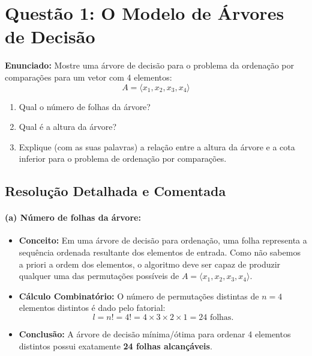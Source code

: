 \documentclass[11pt,a4paper]{article}
\begin{document}
\section*{Questão 1: O Modelo de Árvores de Decisão}

\textbf{Enunciado:} Mostre uma árvore de decisão para o problema da ordenação por comparações para um vetor com 4 elementos:
\[
A = \langle x_1, x_2, x_3, x_4 \rangle
\]
\begin{enumerate}
    \item[(a)] Qual o número de folhas da árvore?
    \item[(b)] Qual é a altura da árvore?
    \item[(c)] Explique (com as suas palavras) a relação entre a altura da árvore e a cota inferior para o problema de ordenação por comparações.
\end{enumerate}

\subsection*{Resolução Detalhada e Comentada}

\paragraph{(a) Número de folhas da árvore:}
\begin{itemize}
    \item \textbf{Conceito:} Em uma árvore de decisão para ordenação, uma folha representa a sequência ordenada resultante dos elementos de entrada. Como não sabemos a priori a ordem dos elementos, o algoritmo deve ser capaz de produzir qualquer uma das permutações possíveis de $A = \langle x_1, x_2, x_3, x_4 \rangle$.
    \item \textbf{Cálculo Combinatório:} O número de permutações distintas de $n = 4$ elementos distintos é dado pelo fatorial:
    \[
        l = n! = 4! = 4 \times 3 \times 2 \times 1 = 24 \text{ folhas}.
    \]
    \item \textbf{Conclusão:} A árvore de decisão mínima/ótima para ordenar 4 elementos distintos possui exatamente \textbf{24 folhas alcançáveis}.
\end{itemize}
\end{document}
